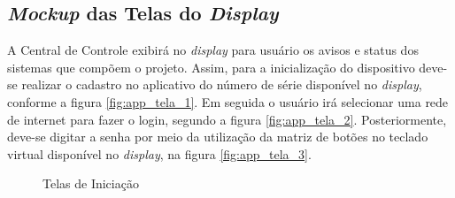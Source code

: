 \begin{apendicesenv}

\chapter{\textit{Mockup} das Telas do \textit{Display}}\label{app_telas_display}

A Central de Controle exibirá no \textit{display} para usuário os avisos e status dos sistemas que compõem o projeto. Assim, para a inicialização do dispositivo deve-se realizar o cadastro no aplicativo do número de série disponível no \textit{display}, conforme a figura \ref{fig:app_tela_1}. Em seguida o usuário irá selecionar uma rede de internet para fazer o login, segundo a figura \ref{fig:app_tela_2}. Posteriormente, deve-se digitar a senha por meio da utilização da matriz de botões no teclado virtual disponível no \textit{display}, na figura \ref{fig:app_tela_3}. 

\begin{figure}[H]
    \centering
    \caption{Telas de Iniciação}\label{fig:telas_1_2_3}
\end{figure}


\end{apendicesenv}
